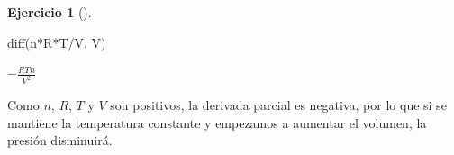 \documentclass[
  a4paper,
]{scrreport}
\newenvironment{Shaded}{\begin{snugshade}}{\end{snugshade}}
\newcommand{\FunctionTok}[1]{\textcolor[rgb]{0.28,0.35,0.67}{#1}}
\newcommand{\NormalTok}[1]{\textcolor[rgb]{0.00,0.23,0.31}{#1}}
\newcommand{\OperatorTok}[1]{\textcolor[rgb]{0.37,0.37,0.37}{#1}}
\theoremstyle{definition}
\newtheorem{exercise}{Ejercicio}[chapter]
\theoremstyle{remark}
\begin{document}
\begin{exercise}[]
\begin{enumerate}
\begin{tcolorbox}
\begin{Shaded}
\begin{Highlighting}[]
\FunctionTok{diff}\NormalTok{(n}\OperatorTok{*}\NormalTok{R}\OperatorTok{*}\NormalTok{T}\OperatorTok{/}\NormalTok{V, V)}
\end{Highlighting}
\end{Shaded}

  $- \frac{R T n}{V^{2}}$

  Como \(n\), \(R\), \(T\) y \(V\) son positivos, la derivada parcial es
  negativa, por lo que si se mantiene la temperatura constante y
  empezamos a aumentar el volumen, la presión disminuirá.

  \end{tcolorbox}
\end{enumerate}

\end{exercise}
\end{document}
